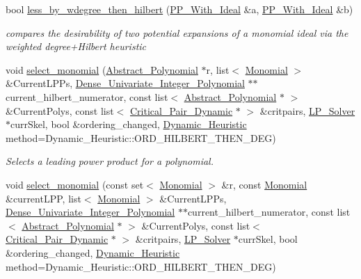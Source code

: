 \begin{DoxyCompactItemize}
bool \hyperlink{namespace_dynamic___engine_a06310dff730cbb5b133b3c907ceb6053}{less\+\_\+by\+\_\+wdegree\+\_\+then\+\_\+hilbert} (\hyperlink{group___g_b_computation_class_dynamic___engine_1_1_p_p___with___ideal}{P\+P\+\_\+\+With\+\_\+\+Ideal} \&a, \hyperlink{group___g_b_computation_class_dynamic___engine_1_1_p_p___with___ideal}{P\+P\+\_\+\+With\+\_\+\+Ideal} \&b)
\begin{DoxyCompactList}\small\item\em compares the desirability of two potential expansions of a monomial ideal via the weighted degree+\+Hilbert heuristic \end{DoxyCompactList}\item 
void \hyperlink{group___g_b_computation_gaa01d88c431b84deabf51ee116d7d2a0e}{select\+\_\+monomial} (\hyperlink{group__polygroup_class_abstract___polynomial}{Abstract\+\_\+\+Polynomial} $\ast$r, list$<$ \hyperlink{group__polygroup_class_monomial}{Monomial} $>$ \&Current\+L\+P\+Ps, \hyperlink{group__polygroup_class_dense___univariate___integer___polynomial}{Dense\+\_\+\+Univariate\+\_\+\+Integer\+\_\+\+Polynomial} $\ast$$\ast$current\+\_\+hilbert\+\_\+numerator, const list$<$ \hyperlink{group__polygroup_class_abstract___polynomial}{Abstract\+\_\+\+Polynomial} $\ast$ $>$ \&Current\+Polys, const list$<$ \hyperlink{group___g_b_computation_class_critical___pair___dynamic}{Critical\+\_\+\+Pair\+\_\+\+Dynamic} $\ast$ $>$ \&critpairs, \hyperlink{group___c_l_s_solvers_class_l_p___solvers_1_1_l_p___solver}{L\+P\+\_\+\+Solver} $\ast$curr\+Skel, bool \&ordering\+\_\+changed, \hyperlink{group___g_b_computation_ga819b1fd40d9a40ff303df3b90647ecb0}{Dynamic\+\_\+\+Heuristic} method=Dynamic\+\_\+\+Heuristic\+::\+O\+R\+D\+\_\+\+H\+I\+L\+B\+E\+R\+T\+\_\+\+T\+H\+E\+N\+\_\+\+D\+EG)
\begin{DoxyCompactList}\small\item\em Selects a leading power product for a polynomial. \end{DoxyCompactList}\item 
void \hyperlink{group___g_b_computation_gabe3fa16acb0927bac0b16e3a4cf4b4f5}{select\+\_\+monomial} (const set$<$ \hyperlink{group__polygroup_class_monomial}{Monomial} $>$ \&r, const \hyperlink{group__polygroup_class_monomial}{Monomial} \&current\+L\+PP, list$<$ \hyperlink{group__polygroup_class_monomial}{Monomial} $>$ \&Current\+L\+P\+Ps, \hyperlink{group__polygroup_class_dense___univariate___integer___polynomial}{Dense\+\_\+\+Univariate\+\_\+\+Integer\+\_\+\+Polynomial} $\ast$$\ast$current\+\_\+hilbert\+\_\+numerator, const list$<$ \hyperlink{group__polygroup_class_abstract___polynomial}{Abstract\+\_\+\+Polynomial} $\ast$ $>$ \&Current\+Polys, const list$<$ \hyperlink{group___g_b_computation_class_critical___pair___dynamic}{Critical\+\_\+\+Pair\+\_\+\+Dynamic} $\ast$ $>$ \&critpairs, \hyperlink{group___c_l_s_solvers_class_l_p___solvers_1_1_l_p___solver}{L\+P\+\_\+\+Solver} $\ast$curr\+Skel, bool \&ordering\+\_\+changed, \hyperlink{group___g_b_computation_ga819b1fd40d9a40ff303df3b90647ecb0}{Dynamic\+\_\+\+Heuristic} method=Dynamic\+\_\+\+Heuristic\+::\+O\+R\+D\+\_\+\+H\+I\+L\+B\+E\+R\+T\+\_\+\+T\+H\+E\+N\+\_\+\+D\+EG)

\end{DoxyCompactItemize}
